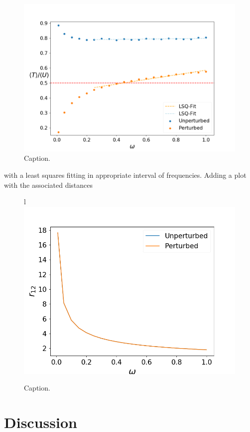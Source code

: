 \documentclass[aip,nobalancelastpage,
twocolumn,
rsi,%
 amsmath,amssymb,
 reprint,%
]{revtex4}
\begin{document}
\begin{figure}[H]
\center
\includegraphics[scale=0.32]{figsPartIII/ratios.png}
\caption{Caption.}
\label{IIIfig1}
\end{figure}

with a least squares fitting in appropriate interval of frequencies. Adding a plot with the associated distances

\begin{figure}[H]l
\center
\includegraphics[scale=0.4]{figsPartIII/distances.png}
\caption{Caption.}
\label{IIIfig2}
\end{figure}


\section{Discussion}
\end{document}
